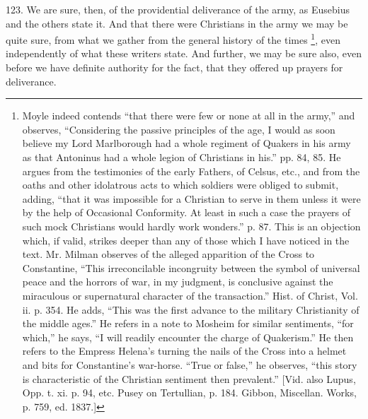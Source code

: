 123.
We are sure, then, of the providential deliverance of the army, as
Eusebius and the others state it. And that there were Christians in
the army we may be quite sure, from what we gather from the general
history of the times \footnote{Moyle indeed contends ``that there were few or none at all in the
army,'' and observes, ``Considering the passive principles of the
age, I would as soon believe my Lord Marlborough had a whole regiment
of Quakers in his army as that Antoninus had a whole legion of
Christians in his.'' pp. 84, 85. He argues from the testimonies of the
early Fathers, of Celsus, etc., and from the oaths and other
idolatrous acts to which soldiers were obliged to submit, adding, ``that
it was impossible for a Christian to serve in them unless it were by
the help of Occasional Conformity. At least in such a case the prayers
of such mock Christians would hardly work wonders.'' p. 87. This is an
objection which, if valid, strikes deeper than any of those which I
have noticed in the text. Mr. Milman observes of the alleged
apparition of the Cross to Constantine, ``This irreconcilable
incongruity between the symbol of universal peace and the horrors of
war, in my judgment, is conclusive against the miraculous or
supernatural character of the transaction.'' Hist. of Christ, Vol. ii.
p. 354. He adds, ``This was the first advance to the military
Christianity of the middle ages.'' He refers in a note to Mosheim for
similar sentiments, ``for which,'' he says, ``I will readily
encounter the charge of Quakerism.'' He then refers to the Empress
Helena's turning the nails of the Cross into a helmet and bits for
Constantine's war-horse. ``True or false,'' he observes, ``this story is
characteristic of the Christian sentiment then prevalent.'' [Vid. also
Lupus, Opp. t. xi. p. 94, etc. Pusey on Tertullian, p. 184. Gibbon,
Miscellan. Works, p. 759, ed. 1837.]},
even independently of what these writers state. And further, we
may be sure also, even before we have definite authority for the fact,
that they offered up prayers for deliverance.

